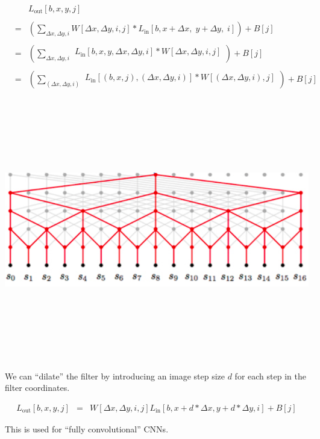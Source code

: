 {{\begin{eqnarray*}
  & & L_{\mathrm{out}}[b,x,y,j] \\
  \\
  & = & \left(\sum_{\Delta x, \Delta y, i} W[\Delta x, \Delta y, i, j] *L_{\mathrm{in}}[b,x + \Delta x,\; y + \Delta y,\; i]\right) + B[j] \\
  \\
      & = & \left(\sum_{\Delta x, \Delta y, i} \begin{array}{l}
                                              L_{\mathrm{in}}[b,x,y,\Delta x,\Delta y,i]
                                              * W[\Delta x, \Delta y, i, j] \\
  \end{array}\right) + B[j] \\
  \\
    & = & \left(\sum_{(\Delta x, \Delta y, i)} \begin{array}{l}
                                              L_{\mathrm{in}}[(b,x,j),(\Delta x,\Delta y,i)]
                                              * W[(\Delta x, \Delta y, i), j] \\
                                           \end{array}\right) + B[j]
\end{eqnarray*}
}


\centerline{\includegraphics[height=4.5in]{../images/dilation}}


We can ``dilate'' the filter by introducing an image step size $d$ for each step in the filter coordinates.

\vfill
\begin{eqnarray*}
L_{\mathrm{out}}[b,x,y,j] & = &  W[\Delta x, \Delta y, i, j] L_{\mathrm{in}}[b,x + d*\Delta x, y + d*\Delta y, i] + B[j]
\end{eqnarray*}

This is used for ``fully convolutional'' CNNs.




}


